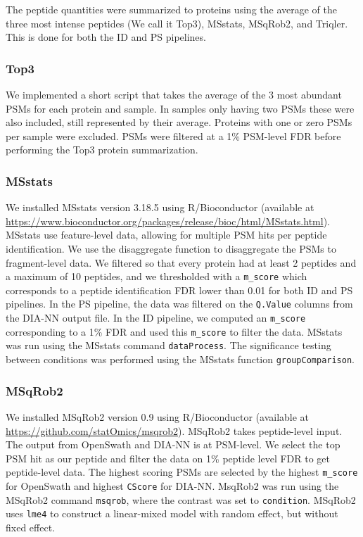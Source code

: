 \documentclass[10pt,letterpaper]{article}
\begin{document}
The peptide quantities were summarized to proteins using the average of the three most intense peptides (We call it Top3), MSstats, MSqRob2, and Triqler. This is done for both the ID and PS pipelines. 

\subsubsection*{Top3}

We implemented a short script that takes the average of the 3 most abundant PSMs for each protein and sample. In samples only having two PSMs these were also included, still represented by their average. Proteins with one or zero PSMs per sample were excluded. PSMs were filtered at a 1\% PSM-level FDR before performing the Top3 protein summarization. 

\subsubsection*{MSstats}

We installed MSstats version 3.18.5 using R/Bioconductor (available at \url{https://www.bioconductor.org/packages/release/bioc/html/MSstats.html}). MSstats use feature-level data, allowing for multiple PSM hits per peptide identification. We use the disaggregate function to disaggregate the PSMs to fragment-level data. We filtered so that every protein had at least 2 peptides and a maximum of 10 peptides, and we thresholded with a \texttt{m\_score} which corresponds to a peptide identification FDR lower than 0.01 for both ID and PS pipelines. In the PS pipeline, the data was filtered on the \texttt{Q.Value} columns from the DIA-NN output file. In the ID pipeline, we computed an \texttt{m\_score} corresponding to a 1\% FDR and used this \texttt{m\_score} to filter the data. MSstats was run using the MSstats command \texttt{dataProcess}. The significance testing between conditions was performed using the MSstats function \texttt{groupComparison}.  

\subsubsection*{MSqRob2}

We installed MSqRob2 version 0.9 using R/Bioconductor (available at \url{https://github.com/statOmics/msqrob2}). MSqRob2 takes peptide-level input. The output from OpenSwath and DIA-NN is at PSM-level. We select the top PSM hit as our peptide and filter the data on 1\% peptide level FDR to get peptide-level data. The highest scoring PSMs are selected by the highest \texttt{m\_score} for OpenSwath and highest \texttt{CScore} for DIA-NN. MsqRob2 was run using the MSqRob2 command \texttt{msqrob}, where the contrast was set to \texttt{condition}.
MSqRob2 uses \texttt{lme4} to construct a linear-mixed model with random effect, but without fixed effect. 
\end{document}
